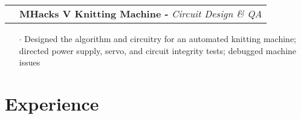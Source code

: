 \documentclass[a4paper, oneside, final]{scrartcl} %
\newcommand{\gray}{\rowcolor[gray]{.90}} %
\begin{document}
\begin{center}
\begin{tabularx}{1.00\linewidth}{>{\raggedleft\scshape}p{0cm}X}
\gray & \textbf{MHacks V Knitting Machine -} \textit{Circuit Design \& QA}\\
\end{tabularx}
\begin{itemize}\itemsep-0.2cm
\vspace{-0.1cm}
\item[$\cdot$] Designed the algorithm and circuitry for an automated knitting machine; directed power supply, servo, and circuit integrity tests; debugged machine issues \\

\end{itemize}



\section{Experience}


\end{center}
\end{document}
